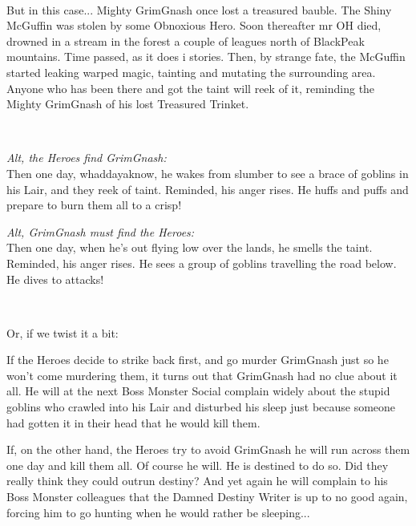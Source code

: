 \

But in this case... Mighty GrimGnash once lost a treasured bauble. The Shiny McGuffin was stolen by some Obnoxious Hero. Soon thereafter mr OH died, drowned in a stream in the forest a couple of leagues north of BlackPeak mountains. Time passed, as it does i stories. Then, by strange fate, the McGuffin started leaking warped magic, tainting and mutating the surrounding area. Anyone who has been there and got the taint will reek of it, reminding the Mighty GrimGnash of his lost Treasured Trinket. 

\

\begin{center}
\begin{minipage}[t]{0.48\textwidth}                   %
    \emph{Alt, the Heroes find GrimGnash:}\\
    Then one day, whaddayaknow, he wakes from slumber to see a brace of goblins in his Lair, and they reek of taint. Reminded, his anger rises. He huffs and puffs and prepare to burn them all to a crisp!
\end{minipage}
\hfill
\begin{minipage}[t]{0.48\textwidth}                   %
    \emph{Alt, GrimGnash must find the Heroes:}\\
    Then one day, when he's out flying low over the lands, he smells the taint. Reminded, his anger rises. He sees a group of goblins travelling the road below. He dives to attacks!
\end{minipage}
\end{center}

\

\noindent Or, if we twist it a bit:

If the Heroes decide to strike back first, and go murder GrimGnash just so he won't come murdering them, it turns out that GrimGnash had no clue about it all. He will at the next Boss Monster Social complain widely about the stupid goblins who crawled into his Lair and disturbed his sleep just because someone had gotten it in their head that he would kill them.

If, on the other hand, the Heroes try to avoid GrimGnash he will run across them one day and kill them all. Of course he will. He is destined to do so. Did they really think they could outrun destiny? And yet again he will complain to his Boss Monster colleagues that the Damned Destiny Writer is up to no good again, forcing him to go hunting when he would rather be sleeping...

